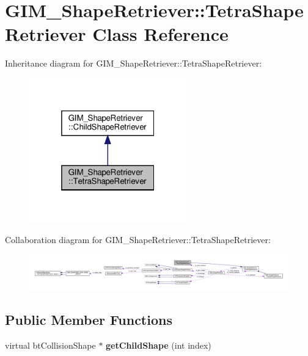 \hypertarget{classGIM__ShapeRetriever_1_1TetraShapeRetriever}{}\section{G\+I\+M\+\_\+\+Shape\+Retriever\+:\+:Tetra\+Shape\+Retriever Class Reference}
\label{classGIM__ShapeRetriever_1_1TetraShapeRetriever}


Inheritance diagram for G\+I\+M\+\_\+\+Shape\+Retriever\+:\+:Tetra\+Shape\+Retriever\+:
\nopagebreak
\begin{figure}[H]
\begin{center}
\leavevmode
\includegraphics[width=193pt]{classGIM__ShapeRetriever_1_1TetraShapeRetriever__inherit__graph}
\end{center}
\end{figure}


Collaboration diagram for G\+I\+M\+\_\+\+Shape\+Retriever\+:\+:Tetra\+Shape\+Retriever\+:
\nopagebreak
\begin{figure}[H]
\begin{center}
\leavevmode
\includegraphics[width=350pt]{classGIM__ShapeRetriever_1_1TetraShapeRetriever__coll__graph}
\end{center}
\end{figure}
\subsection*{Public Member Functions}
\begin{DoxyCompactItemize}
\item 
\mbox{\label{classGIM__ShapeRetriever_1_1TetraShapeRetriever_a377761f5c9db09888a8828741e2e7297}} 
virtual bt\+Collision\+Shape $\ast$ {\bfseries get\+Child\+Shape} (int index)
\end{DoxyCompactItemize}
